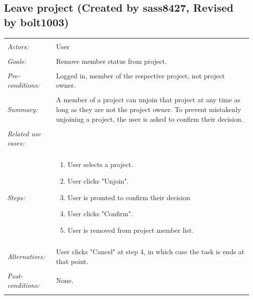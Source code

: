 \documentclass[11pt]{report}
\begin{document}
\subsection{Leave project (Created by sass8427, Revised by bolt1003)}
\begin{tabular}{ p{2cm} p{12cm} }
 \hline
 \\
 \textit{Actors:} & User \\ 
 \\
 \textit{Goals:} & Remove member status from project. \\
 \\
 \textit{Pre-conditions:} & Logged in, member of the respective project, not project owner.  \\
\\
 \textit{Summary:} & A member of a project can unjoin that project at any time as long as they are not the project owner. To prevent mistakenly unjoining a project, the user is asked to confirm their decision.\\ 
 \\
 \textit{Related use cases:} & \\ 
 \\
 \textit{Steps:} & \begin{enumerate}
  \item User selects a project.
  \item User clicks "Unjoin". 
  \item User is promted to confirm their decision
  \item User clicks "Confirm".
  \item User is removed from project member list.    
 \end{enumerate} \\
 \\
 \textit{Alternatives:} & User clicks "Cancel" at step 4, in which case the task is ends at that point. \\
 \\
 \textit{Post-conditions:} & None. \\
 \\
\hline
\end{tabular}
\end{document}

